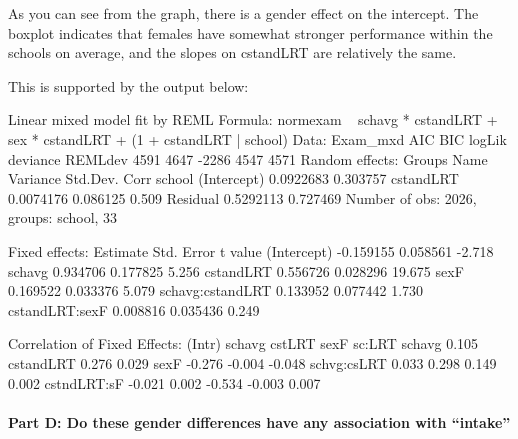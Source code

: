 \documentclass{article}
\begin{document}
As you can see from the graph, there is a gender effect on the intercept.  The boxplot indicates that females have somewhat stronger performance within the schools on average, and the slopes on cstandLRT are relatively the same.  

This is supported by the output below:

\begin{Schunk}
\begin{Soutput}
Linear mixed model fit by REML 
Formula: normexam ~ schavg * cstandLRT + sex * cstandLRT + (1 + cstandLRT |      school) 
   Data: Exam_mxd 
  AIC  BIC logLik deviance REMLdev
 4591 4647  -2286     4547    4571
Random effects:
 Groups   Name        Variance  Std.Dev. Corr  
 school   (Intercept) 0.0922683 0.303757       
          cstandLRT   0.0074176 0.086125 0.509 
 Residual             0.5292113 0.727469       
Number of obs: 2026, groups: school, 33

Fixed effects:
                  Estimate Std. Error t value
(Intercept)      -0.159155   0.058561  -2.718
schavg            0.934706   0.177825   5.256
cstandLRT         0.556726   0.028296  19.675
sexF              0.169522   0.033376   5.079
schavg:cstandLRT  0.133952   0.077442   1.730
cstandLRT:sexF    0.008816   0.035436   0.249

Correlation of Fixed Effects:
            (Intr) schavg cstLRT sexF   sc:LRT
schavg       0.105                            
cstandLRT    0.276  0.029                     
sexF        -0.276 -0.004 -0.048              
schvg:csLRT  0.033  0.298  0.149  0.002       
cstndLRT:sF -0.021  0.002 -0.534 -0.003  0.007
\end{Soutput}
\end{Schunk}


\paragraph{\textbf{Part D:} Do these gender differences have any association with ``intake''}
\end{document}
